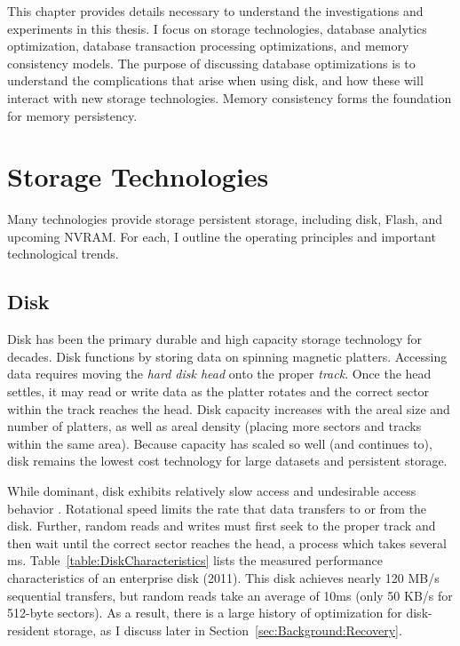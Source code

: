This chapter provides details necessary to understand the investigations and experiments in this thesis.
I focus on storage technologies, database analytics optimization, database transaction processing optimizations, and memory consistency models.
The purpose of discussing database optimizations is to understand the complications that arise when using disk, and how these will interact with new storage technologies.
Memory consistency forms the foundation for memory persistency.

\section{Storage Technologies}
\label{sec:Background:Storage}

Many technologies provide storage persistent storage, including disk, Flash, and upcoming NVRAM.
For each, I outline the operating principles and important technological trends.



\subsection{Disk}
\label{sec:Background:Storage:Disk}
Disk has been the primary durable and high capacity storage technology for decades.
Disk functions by storing data on spinning magnetic platters.
Accessing data requires moving the \emph{hard disk head} onto the proper \emph{track}.
Once the head settles, it may read or write data as the platter rotates and the correct sector within the track reaches the head.
Disk capacity increases with the areal size and number of platters, as well as areal density (placing more sectors and tracks within the same area).
Because capacity has scaled so well (and continues to), disk remains the lowest cost technology for large datasets and persistent storage.

While dominant, disk exhibits relatively slow access and undesirable access behavior \cite{RuemmlerWilkes94}.
Rotational speed limits the rate that data transfers to or from the disk.
Further, random reads and writes must first seek to the proper track and then wait until the correct sector reaches the head, a process which takes several ms.
Table~\ref{table:DiskCharacteristics} lists the measured performance characteristics of an enterprise disk (2011).
This disk achieves nearly 120 MB/s sequential transfers, but random reads take an average of 10ms (only 50 KB/s for 512-byte sectors).
As a result, there is a large history of optimization for disk-resident storage, as I discuss later in Section~\ref{sec:Background:Recovery}.

